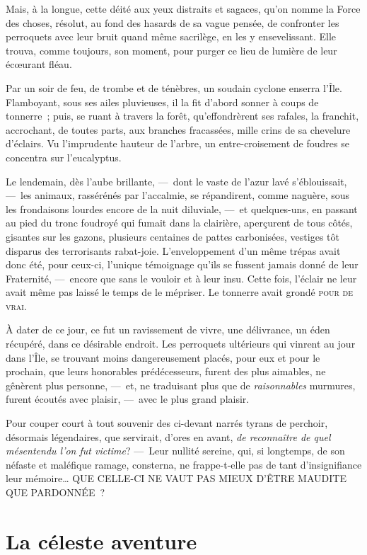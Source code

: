 \documentclass[french,twoside]{book} %
\begin{document}
Mais, à la longue, cette déité aux yeux distraits et sagaces, qu’on nomme la Force des choses, résolut, au fond des hasards de sa vague pensée, de confronter les perroquets avec leur bruit quand même sacrilège, en les y ensevelissant. Elle trouva, comme toujours, son moment, pour purger ce lieu de lumière de leur écœurant fléau.\par
Par un soir de feu, de trombe et de ténèbres, un soudain cyclone enserra l’Île. Flamboyant, sous ses ailes pluvieuses, il la fit d’abord sonner à coups de tonnerre ; puis, se ruant à travers la forêt, qu’effondrèrent ses rafales, la franchit, accrochant, de toutes parts, aux branches fracassées, mille crins de sa chevelure d’éclairs. Vu l’imprudente hauteur de l’arbre, un entre-croisement de foudres se concentra sur l’eucalyptus.\par
   Le lendemain, dès l’aube brillante, — dont le vaste de l’azur lavé s’éblouissait, — les animaux, rassérénés par l’accalmie, se répandirent, comme naguère, sous les frondaisons lourdes encore de la nuit diluviale, — et quelques-uns, en passant au pied du tronc foudroyé qui fumait dans la clairière, aperçurent de tous côtés, gisantes sur les gazons, plusieurs centaines de pattes carbonisées, vestiges tôt disparus des terrorisants rabat-joie. L’enveloppement d’un même trépas avait donc été, pour ceux-ci, l’unique témoignage qu’ils se fussent jamais donné de leur Fraternité, — encore que sans le vouloir et à leur insu. Cette fois, l’éclair ne leur avait même pas laissé le temps de le mépriser. Le tonnerre avait grondé {\scshape pour de vrai}.\par
À dater de ce jour, ce fut un ravissement de vivre, une délivrance, un éden récupéré, dans ce désirable endroit. Les perroquets ultérieurs qui vinrent au jour dans l’Île, se trouvant moins dangereusement placés, pour eux et pour le prochain, que leurs honorables prédécesseurs, furent des plus aimables, ne gênèrent plus personne, — et,   ne traduisant plus que de \emph{raisonnables} murmures, furent écoutés avec plaisir, — avec le plus grand plaisir.\par
Pour couper court à tout souvenir des ci-devant narrés tyrans de perchoir, désormais légendaires, que servirait, d’ores en avant, \emph{de reconnaître de quel mésentendu l’on fut victime}? — Leur nullité sereine, qui, si longtemps, de son néfaste et maléfique ramage, consterna, ne frappe-t-elle pas de tant d’insignifiance leur mémoire… QUE CELLE-CI NE VAUT PAS MIEUX D’ÊTRE MAUDITE QUE PARDONNÉE ?
 \section[{La céleste aventure}]{La céleste aventure}\renewcommand{\leftmark}{La céleste aventure}
\end{document}
